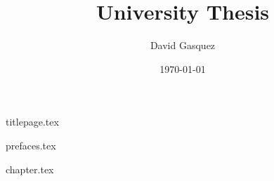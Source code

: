 \documentclass[
    a4paper,
    12pt
]{report}
\title{University Thesis}
\author{David Gasquez}
\date{\today}
\begin{document}
{titlepage.tex}

{prefaces.tex}

{chapter.tex}

\printbibliography
\end{document}
